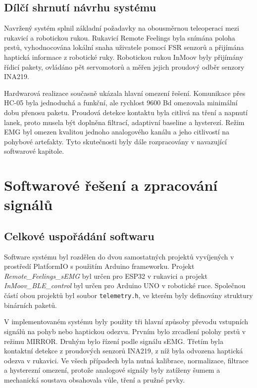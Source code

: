 \section{Dílčí shrnutí návrhu systému}
\label{sec:shrnuti-navrhu}

Navržený systém splnil základní požadavky na obousměrnou teleoperaci mezi rukavicí a robotickou rukou. Rukavicí Remote Feelings byla snímána poloha prstů, vyhodnocována lokální snaha uživatele pomocí FSR senzorů a přijímána haptická informace z robotické ruky. Robotickou rukou InMoov byly přijímány řídicí pakety, ovládáno pět servomotorů a měřen jejich proudový odběr senzory INA219.

Hardwarová realizace současně ukázala hlavní omezení řešení. Komunikace přes HC-05 byla jednoduchá a funkční, ale rychlost 9600 Bd omezovala minimální dobu přenosu paketu. Proudová detekce kontaktu byla citlivá na tření a napnutí lanek, proto musela být doplněna filtrací, adaptivní baseline a hysterezí. Režim EMG byl omezen kvalitou jednoho analogového kanálu a jeho citlivostí na pohybové artefakty. Tyto skutečnosti byly dále rozpracovány v navazující softwarové kapitole.

\chapter{Softwarové řešení a zpracování signálů}
\label{chap:software}

\section{Celkové uspořádání softwaru}
\label{sec:celkove-usporadani-softwaru}

Software systému byl rozdělen do dvou samostatných projektů vyvíjených v prostředí PlatformIO s použitím Arduino frameworku. Projekt \textit{Remote\_Feelings\_sEMG} byl určen pro ESP32 v rukavici a projekt \textit{InMoov\_BLE\_control} byl určen pro Arduino UNO v robotické ruce. Společnou částí obou projektů byl soubor \texttt{telemetry.h}, ve kterém byly definovány struktury binárních paketů.

V implementovaném systému byly použity tři hlavní způsoby převodu vstupních signálů na pohyb nebo haptickou odezvu. Prvním bylo zrcadlení polohy prstů v režimu MIRROR\@. Druhým bylo řízení podle signálu sEMG\@. Třetím byla kontaktní detekce z proudových senzorů INA219, z níž byla odvozena haptická odezva v rukavici. Ve všech případech byla nutná kalibrace, normalizace, filtrace a hysterezní omezení, protože analogové signály byly zatíženy šumem a mechanická soustava obsahovala vůle, tření a pružné prvky.

